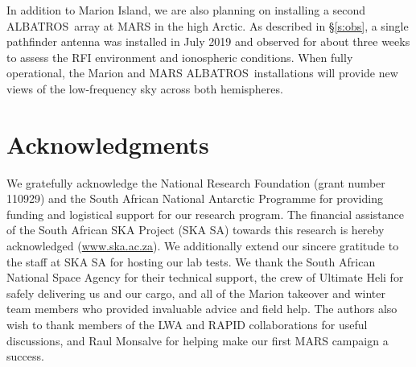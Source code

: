 \documentclass{ws-jai}
\def\albatros{ALBATROS}
\begin{document}
In addition to Marion Island, we are also planning on installing a
second \albatros\ array at MARS in the high Arctic.  As described in
\S\ref{s:obs}, a single pathfinder antenna was installed in July 2019
and observed for about three weeks to assess the RFI environment and
ionospheric conditions.  When fully operational, the Marion and MARS
\albatros\ installations will provide new views of the low-frequency
sky across both hemispheres.

\section*{Acknowledgments}

We gratefully acknowledge the National Research Foundation (grant
number 110929) and the South African National Antarctic Programme for
providing funding and logistical support for our research program.
The financial assistance of the South African SKA Project (SKA SA)
towards this research is hereby acknowledged (\url{www.ska.ac.za}).
We additionally extend our sincere gratitude to the staff at SKA SA
for hosting our lab tests.  We thank the South African National Space
Agency for their technical support, the crew of Ultimate Heli for
safely delivering us and our cargo, and all of the Marion takeover and
winter team members who provided invaluable advice and field help.
The authors also wish to thank members of the LWA and RAPID
collaborations for useful discussions, and Raul Monsalve for helping
make our first MARS campaign a success.


{}
\end{document}
